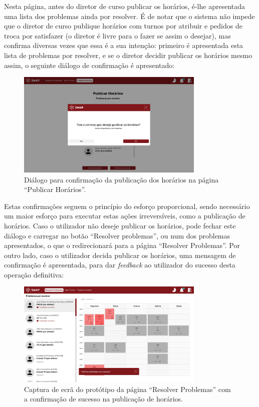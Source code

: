 \documentclass[12pt, a4paper]{article}
\begin{document}
Nesta página, antes do diretor de curso publicar os horários, é-lhe apresentada uma lista dos
problemas ainda por resolver. É de notar que o sistema não impede que o diretor de curso publique
horários com turnos por atribuir e pedidos de troca por satisfazer (o diretor é livre para o fazer
se assim o desejar), mas confirma diversas vezes que essa é a sua intenção: primeiro é apresentada
esta lista de problemas por resolver, e se o diretor decidir publicar os horários mesmo assim, o
seguinte diálogo de confirmação é apresentado:

\begin{figure}[H]
    \centering
    \includegraphics[width=0.8\textwidth]{res/prototype/dialogo-confirmacao-publicacao.png}
    \caption{Diálogo para confirmação da publicação dos horários na página ``Publicar Horários''.}
    \label{dialogo-confirmacao-publicacao}
\end{figure}

Estas confirmações seguem o princípio do esforço proporcional, sendo necessário um maior esforço
para executar estas ações irreversíveis, como a publicação de horários. Caso o utilizador não deseje
publicar os horários, pode fechar este diálogo e carregar no botão ``Resolver problemas'', ou num
dos problemas apresentados, o que o redirecionará para a página ``Resolver Problemas''. Por outro
lado, caso o utilizador decida publicar os horários, uma mensagem de confirmação é apresentada, para
dar \emph{feedback} ao utilizador do sucesso desta operação definitiva:

\begin{figure}[H]
    \centering
    \includegraphics[width=0.8\textwidth]
        {res/prototype/resolver-problemas-toast-sucesso-publicao.png}
    \caption{
        \onehalfspacing
        Captura de ecrã do protótipo da página ``Resolver Problemas'' com a confirmação de sucesso
        na publicação de horários.
    }
    \label{resolver-problemas-toast-sucesso-publicao}
\end{figure}
\end{document}
